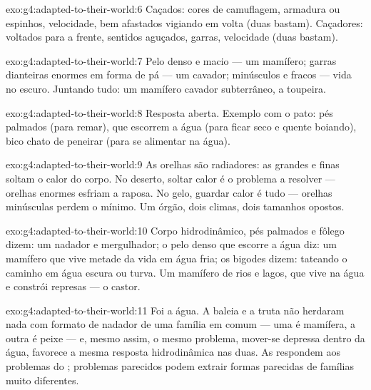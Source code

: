 \begin{solution}{exo:g4:adapted-to-their-world:6}
Caçados: cores de camuflagem, armadura ou espinhos, velocidade,
 bem afastados vigiando em volta (duas bastam). Caçadores:
 voltados para a frente, sentidos aguçados, garras, velocidade
(duas bastam).
\end{solution}

\begin{solution}{exo:g4:adapted-to-their-world:7}
Pelo denso e macio --- um mamífero; garras dianteiras enormes em
forma de pá --- um cavador;  minúsculos e fracos --- vida no
escuro. Juntando tudo: um mamífero cavador subterrâneo, a toupeira.
\end{solution}

\begin{solution}{exo:g4:adapted-to-their-world:8}
Resposta aberta. Exemplo com o pato: pés palmados (para remar), 
que escorrem a água (para ficar seco e quente boiando), bico chato de
peneirar (para se alimentar na água).
\end{solution}

\begin{solution}{exo:g4:adapted-to-their-world:9}
As orelhas são radiadores: as grandes e finas soltam o calor do
corpo. No deserto, soltar calor é o problema a resolver --- orelhas
enormes esfriam a raposa. No gelo, guardar calor é tudo --- orelhas
minúsculas perdem o mínimo. Um órgão, dois climas, dois tamanhos
opostos.
\end{solution}

\begin{solution}{exo:g4:adapted-to-their-world:10}
Corpo hidrodinâmico, pés palmados e fôlego dizem: um nadador e
mergulhador; o pelo denso que escorre a água diz: um mamífero que
vive metade da vida em água fria; os bigodes dizem: tateando o
caminho em água escura ou turva. Um mamífero de rios e lagos, que
vive na água e constrói represas --- o castor.
\end{solution}

\begin{solution}{exo:g4:adapted-to-their-world:11}
Foi a água. A baleia e a truta não herdaram nada com formato de
nadador de uma família em comum --- uma é mamífera, a outra é peixe
--- e, mesmo assim, o mesmo problema, mover-se depressa dentro da
água, favorece a mesma resposta hidrodinâmica nas duas. As 
respondem aos problemas do ; problemas parecidos podem
extrair formas parecidas de famílias muito diferentes.
\end{solution}
